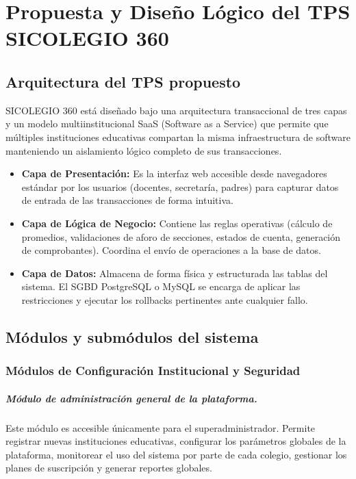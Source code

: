 \documentclass[12pt,a4paper,oneside]{report}
\begin{document}
\chapter{Propuesta y Diseño Lógico del TPS SICOLEGIO 360}

\section{Arquitectura del TPS propuesto}

SICOLEGIO 360 está diseñado bajo una arquitectura transaccional de tres capas y un modelo multiinstitucional SaaS (Software as a Service) que permite que múltiples instituciones educativas compartan la misma infraestructura de software manteniendo un aislamiento lógico completo de sus transacciones.

\begin{itemize}
    \item \textbf{Capa de Presentación:} Es la interfaz web accesible desde navegadores estándar por los usuarios (docentes, secretaría, padres) para capturar datos de entrada de las transacciones de forma intuitiva.
    \item \textbf{Capa de Lógica de Negocio:} Contiene las reglas operativas (cálculo de promedios, validaciones de aforo de secciones, estados de cuenta, generación de comprobantes). Coordina el envío de operaciones a la base de datos.
    \item \textbf{Capa de Datos:} Almacena de forma física y estructurada las tablas del sistema. El SGBD PostgreSQL o MySQL se encarga de aplicar las restricciones y ejecutar los rollbacks pertinentes ante cualquier fallo.
\end{itemize}

\section{Módulos y submódulos del sistema}

\subsection{Módulos de Configuración Institucional y Seguridad}

\paragraph{Módulo de administración general de la plataforma.} Este módulo es accesible únicamente para el superadministrador. Permite registrar nuevas instituciones educativas, configurar los parámetros globales de la plataforma, monitorear el uso del sistema por parte de cada colegio, gestionar los planes de suscripción y generar reportes globales.
\end{document}
